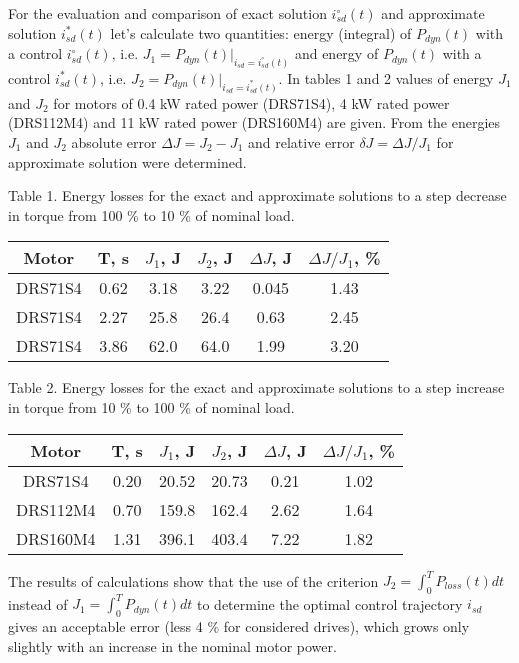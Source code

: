 \documentclass[journal]{IEEEtran}
\begin{document}
For the evaluation and comparison of exact solution $i_{sd}^\circ(t)$ and approximate solution $i_{sd}^*(t)$ let's calculate two quantities: energy (integral) of $P_{dyn}(t)$ with a control $i_{sd}^\circ(t)$, i.e. $J_1 = P_{dyn}(t) \bigg|_{i_{sd} = i_{sd}^\circ(t)}$ and energy of $P_{dyn}(t)$ with a control $i_{sd}^*(t)$, i.e. $J_2 = P_{dyn}(t) \bigg|_{i_{sd} = i_{sd}^*(t)}$. In tables 1 and 2 values of energy $J_1$ and $J_2$ for motors of 0.4 kW rated power (DRS71S4), 4 kW rated power (DRS112M4) and 11 kW rated power (DRS160M4) are given. From the energies $J_1$ and $J_2$ absolute error $\Delta J = J_2 - J_1$ and relative error $\delta J = \Delta J/J_1$ for approximate solution were determined.


\begin{center}
Table 1.
Energy losses for the exact and approximate solutions to a step decrease in torque from 100 \% to 10 \% of nominal load.

\begin{tabular}{ | c | c | c | c | c | c | }
\hline 
Motor & T, s & $J_1$, J & $J_2$, J & $\Delta J$, J & $\Delta J/J_1$, \% \\
\hline 
DRS71S4  & 0.62 & 3.18 & 3.22 & 0.045 & 1.43 \\
DRS71S4  & 2.27 & 25.8 & 26.4 & 0.63 & 2.45 \\
DRS71S4  & 3.86 & 62.0 & 64.0 & 1.99 & 3.20 \\
\hline 
\end{tabular}

\end{center}

\begin{center}
Table 2.
Energy losses for the exact and approximate solutions to a step increase in torque from 10 \% to 100 \% of nominal load.

\begin{tabular}{ | c | c | c | c | c | c | }
\hline 
Motor & T, s & $J_1$, J & $J_2$, J & $\Delta J$, J & $\Delta J/J_1$, \% \\
\hline 
DRS71S4  & 0.20 & 20.52 & 20.73 & 0.21 & 1.02 \\
DRS112M4 & 0.70 & 159.8 & 162.4 & 2.62 & 1.64 \\
DRS160M4 & 1.31 & 396.1 & 403.4 & 7.22 & 1.82 \\
\hline 
\end{tabular}

\end{center}

The results of calculations show that the use of the criterion $J_2 = \int_0^T P_{loss}(t) dt$ instead of $J_1 = \int_0^T P_{dyn}(t) dt$ to determine the optimal control trajectory $i_{sd}$ gives an acceptable error (less 4 \% for considered drives), which grows only slightly with an increase in the nominal motor power.
\end{document}
